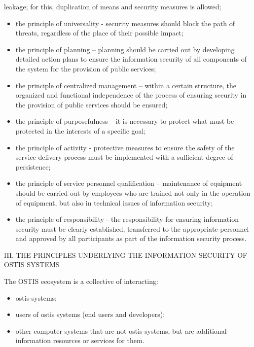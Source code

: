 \documentclass{article}
\begin{document}
\begin{multicols}{2}

    \begin{description}[leftmargin=!, labelwidth=0.7cm, itemsep=-1.5mm]
leakage; for this, duplication of means and security
measures is allowed;
    \end{description}
\par
\vspace{-0.4cm} \begin{itemize}
    \item the principle of universality - security measures
should block the path of threats, regardless of the
place of their possible impact;
    \item the principle of planning – planning should be carried
out by developing detailed action plans to ensure
the information security of all components of the
system for the provision of public services;
    \item the principle of centralized management – within
a certain structure, the organized and functional
independence of the process of ensuring security in
the provision of public services should be ensured;
    \item the principle of purposefulness – it is necessary to
protect what must be protected in the interests of a
specific goal;
    \item the principle of activity - protective measures to
ensure the safety of the service delivery process
must be implemented with a sufficient degree of
persistence;
    \item the principle of service personnel qualification –
maintenance of equipment should be carried out
by employees who are trained not only in the
operation of equipment, but also in technical issues
of information security;
    \item the principle of responsibility - the responsibility
for ensuring information security must be clearly
established, transferred to the appropriate personnel
and approved by all participants as part of the
information security process.
\end{itemize}
    \begin{center} III.  THE PRINCIPLES UNDERLYING THE INFORMATION
SECURITY OF OSTIS SYSTEMS
    \end{center}
The OSTIS ecosystem is a collective of interacting:

\begin{itemize}
    \item ostis-systems;
    \item  users of ostis systems (end users and developers);
    \item other computer systems that are not ostis-systems,
but are additional information resources or services
for them.
\end{itemize}


\end{multicols}
\end{document}
